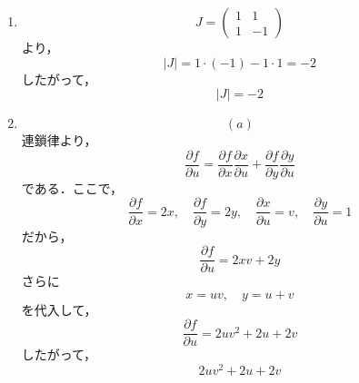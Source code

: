 \documentclass[uplatex,a4paper,12pt]{jsarticle}
\begin{document}
\begin{enumerate}
\item
\[
J=
\begin{pmatrix}
1&1\\
1&-1
\end{pmatrix}
\]
より，
\[
|J|=1\cdot(-1)-1\cdot1=-2
\]
したがって，
\[
\boxed{|J|=-2}
\]

\item
\[
\boxed{(a)}
\]
連鎖律より，
\[
\frac{\partial f}{\partial u}
=
\frac{\partial f}{\partial x}\frac{\partial x}{\partial u}
+
\frac{\partial f}{\partial y}\frac{\partial y}{\partial u}
\]
である．ここで，
\[
\frac{\partial f}{\partial x}=2x,\quad
\frac{\partial f}{\partial y}=2y,\quad
\frac{\partial x}{\partial u}=v,\quad
\frac{\partial y}{\partial u}=1
\]
だから，
\[
\frac{\partial f}{\partial u}
=
2xv+2y
\]
さらに
\[
x=uv,\quad y=u+v
\]
を代入して，
\[
\frac{\partial f}{\partial u}
=
2uv^2+2u+2v
\]
したがって，
\[
\boxed{2uv^2+2u+2v}
\]

\end{enumerate}
\end{document}
